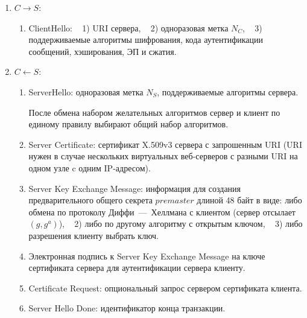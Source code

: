 \begin{enumerate}
    \item $C \rightarrow S$:
        \begin{enumerate}
            \item ClientHello: ~ 1) URI сервера, ~ 2) одноразовая метка $N_C$, ~ 3) поддерживаемые алгоритмы шифрования, кода аутентификации сообщений, хэширования, ЭП и сжатия.
        \end{enumerate}

    \item $C \leftarrow S$:
        \begin{enumerate}
            \item ServerHello: одноразовая метка $N_S$, поддерживаемые алгоритмы сервера.

            После обмена набором желательных алгоритмов сервер и клиент по единому правилу выбирают общий набор алгоритмов.
            \item Server Certificate: сертификат X.509v3 сервера с запрошенным URI (URI нужен в случае нескольких виртуальных веб-серверов с разными URI на одном узле c одним IP-адресом).
            \item Server Key Exchange Message: информация для создания предварительного общего секрета $premaster$ длиной 48 байт в виде: либо обмена по протоколу Диффи~---~Хеллмана с клиентом (сервер отсылает $(g, g^a)$), ~ 2) либо по другому алгоритму с открытым ключом, ~ 3) либо разрешения клиенту выбрать ключ.
            \item Электронная подпись к Server Key Exchange Message на ключе сертификата сервера для аутентификации сервера клиенту.
            \item Certificate Request: опциональный запрос сервером сертификата клиента.
            \item Server Hello Done: идентификатор конца транзакции.
        \end{enumerate}


\end{enumerate}
